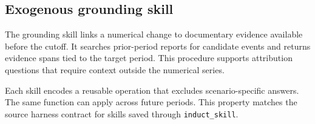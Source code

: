 \subsection{Exogenous grounding skill}
The grounding skill links a numerical change to documentary evidence available before the cutoff. It searches prior-period reports for candidate events and returns evidence spans tied to the target period. This procedure supports attribution questions that require context outside the numerical series.

Each skill encodes a reusable operation that excludes scenario-specific answers. The same function can apply across future periods. This property matches the source harness contract for skills saved through \texttt{induct\_skill}.
